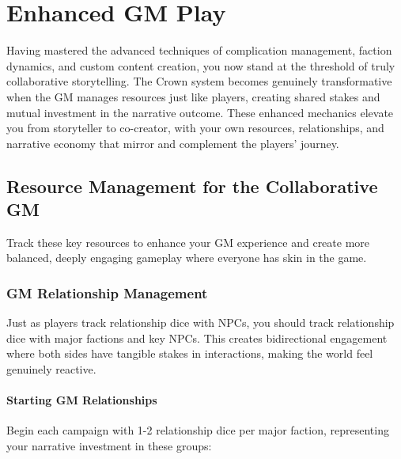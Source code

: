 \chapter{Enhanced GM Play}

Having mastered the advanced techniques of complication management, faction dynamics, and custom content creation, you now stand at the threshold of truly collaborative storytelling. The Crown system becomes genuinely transformative when the GM manages resources just like players, creating shared stakes and mutual investment in the narrative outcome. These enhanced mechanics elevate you from storyteller to co-creator, with your own resources, relationships, and narrative economy that mirror and complement the players' journey.

\section*{Resource Management for the Collaborative GM}

Track these key resources to enhance your GM experience and create more balanced, deeply engaging gameplay where everyone has skin in the game.

\subsection*{GM Relationship Management}

Just as players track relationship dice with NPCs, you should track relationship dice with major factions and key NPCs. This creates bidirectional engagement where both sides have tangible stakes in interactions, making the world feel genuinely reactive.

\subsubsection*{Starting GM Relationships}

Begin each campaign with 1-2 relationship dice per major faction, representing your narrative investment in these groups:

